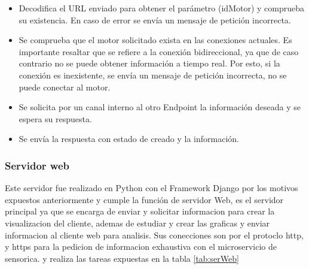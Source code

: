    \begin{itemize}
        \item Decodifica el URL enviado para obtener el parámetro (idMotor) y
            comprueba su existencia. En caso de error se envía un mensaje
            de petición incorrecta.
        \item Se comprueba que el motor solicitado exista en las conexiones
            actuales. Es importante resaltar que se refiere a la conexión
            bidireccional, ya que de caso contrario no se puede obtener información
            a tiempo real. Por esto, si la conexión es inexistente, se envía un
            mensaje de petición incorrecta, no se puede conectar al motor.
        \item Se solicita por un canal interno al otro Endpoint la información
            deseada y se espera su respuesta.
        \item Se envía la respuesta con estado de creado y la información.
    \end{itemize}

    \subsubsection{Servidor web}
    Este servidor fue realizado en Python con el Framework Django
    por los motivos expuestos anteriormente y cumple la función de servidor Web,
    es el servidor principal ya que se encarga de enviar y solicitar informacion
    para crear la visualizacion del cliente, ademas de estudiar y crear las graficas
    y enviar informacion al cliente web para analisis.
    Sus conecciones son por el protoclo http, y https para la pedicion de informacion
    exhaustiva con el microservicio de sensorica. y realiza las tareas expuestas
    en la tabla \ref{tab:serWeb}

